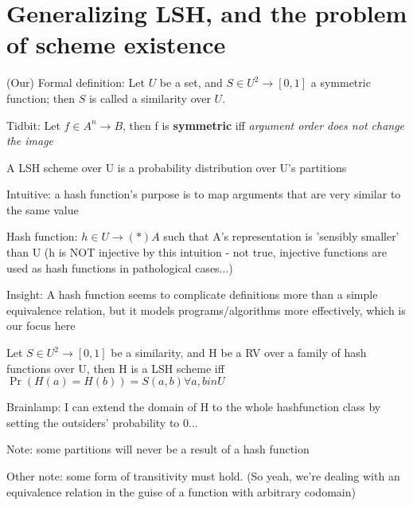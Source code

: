\documentclass{report}
\begin{document}
	
\section{Generalizing LSH, and the problem of scheme existence}

	
	(Our) Formal definition: Let $U$ be a set, and $S \in U^2 \to [0, 1]$ a symmetric function; then $S$ is called a similarity over $U$.
	
	Tidbit: Let $f \in A^n \to B$, then f is \textbf{symmetric} iff \textit{argument order does not change the image} %
	
	A LSH scheme over U is a probability distribution over U's partitions
	
	
	Intuitive: a hash function's purpose is to map arguments that are very similar to the same value
	
	Hash function: $h \in U \to (*)A$ such that A's representation is 'sensibly smaller' than U (h is NOT injective by this intuition - not true, injective functions are used as hash functions in pathological cases...)
	
	Insight: A hash function seems to complicate definitions more than a simple equivalence relation, but it models programs/algorithms more effectively, which is our focus here
	
	
	Let $S \in U^2 \to [0, 1]$ be a similarity, and H be a RV over a family of hash functions over U, then H is a LSH scheme iff $\Pr(H(a)=H(b)) = S(a,b) \forall a,b in U$
	
	Brainlamp: I can extend the domain of H to the whole hashfunction class by setting the outsiders' probability to 0...
	
	
	Note: some partitions will never be a result of a hash function 
	
	Other note: some form of transitivity must hold. (So yeah, we're dealing with an equivalence relation in the guise of a function with arbitrary codomain)
	
	\
	
\end{document}
